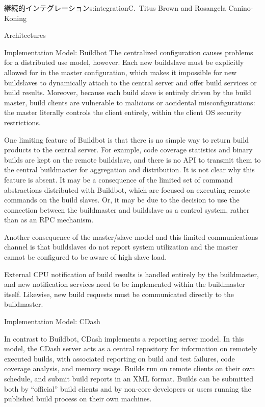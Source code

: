 \begin{aosachapter}{継続的インテグレーション}{s:integration}{C.\ Titus Brown and Rosangela Canino-Koning}
\begin{aosasect1}{Architectures}
\begin{aosasect2}{Implementation Model: Buildbot}
The centralized configuration causes problems for a distributed use
model, however. Each new buildslave must be explicitly allowed for in
the master configuration, which makes it impossible for new
buildslaves to dynamically attach to the central server and offer
build services or build results. Moreover, because each build slave is
entirely driven by the build master, build clients are vulnerable to
malicious or accidental misconfigurations: the master literally
controls the client entirely, within the client OS security
restrictions.

One limiting feature of Buildbot is that there is no simple way to
return build products to the central server. For example, code
coverage statistics and binary builds are kept on the remote
buildslave, and there is no API to transmit them to the central
buildmaster for aggregation and distribution. It is not clear why this
feature is absent. It may be a consequence of the limited set of
command abstractions distributed with Buildbot, which are focused on
executing remote commands on the build slaves. Or, it may be due to
the decision to use the connection between the buildmaster and
buildslave as a control system, rather than as an RPC mechanism.

Another consequence of the master/slave model and this limited
communications channel is that buildslaves do not report system
utilization and the master cannot be configured to be aware of high
slave load.

External CPU notification of build results is handled entirely by the
buildmaster, and new notification services need to be implemented
within the buildmaster itself. Likewise, new build requests must be
communicated directly to the buildmaster.

\end{aosasect2}

\begin{aosasect2}{Implementation Model: CDash}


In contrast to Buildbot, CDash implements a reporting server model. In
this model, the CDash server acts as a central repository for
information on remotely executed builds, with associated reporting on
build and test failures, code coverage analysis, and memory
usage. Builds run on remote clients on their own schedule, and submit
build reports in an XML format. Builds can be submitted both by
``official'' build clients and by non-core developers or users running
the published build process on their own machines.


\end{aosasect2}
\end{aosasect1}
\end{aosachapter}
